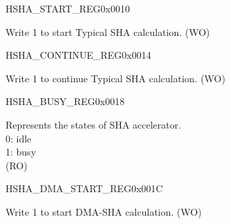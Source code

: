 \begin{register}{H}{SHA\_START\_REG}{0x0010}\label{regdesc:SHASTARTREG}
%
%
\regnewline%
\begin{regdesc}\begin{reglist}
\label{fielddesc:SHASTART}\item [SHA\_START] Write 1 to start Typical SHA calculation. (WO)
\end{reglist}\end{regdesc}
\end{register}


\begin{register}{H}{SHA\_CONTINUE\_REG}{0x0014}\label{regdesc:SHACONTINUEREG}
%
%
\regnewline%
\begin{regdesc}\begin{reglist}
\label{fielddesc:SHACONTINUE}\item [SHA\_CONTINUE] Write 1 to continue Typical SHA calculation. (WO)
\end{reglist}\end{regdesc}
\end{register}


\begin{register}{H}{SHA\_BUSY\_REG}{0x0018}\label{regdesc:SHABUSYREG}
%
%
\regnewline%
\begin{regdesc}\begin{reglist}
\label{fielddesc:SHABUSYSTATE}\item [SHA\_BUSY\_STATE] Represents the states of SHA accelerator. \\
0: idle\\
1: busy\\
(RO)
\end{reglist}\end{regdesc}
\end{register}


\begin{register}{H}{SHA\_DMA\_START\_REG}{0x001C}\label{regdesc:SHADMASTARTREG}
%
%
\regnewline%
\begin{regdesc}\begin{reglist}
\label{fielddesc:SHADMASTART}\item [SHA\_DMA\_START] Write 1 to start DMA-SHA calculation. (WO)
\end{reglist}\end{regdesc}
\end{register}


